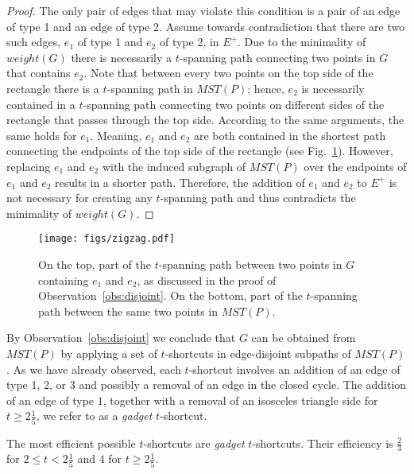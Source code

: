 \documentclass[a4paper]{llncs}
\newcommand{\smallt}{$2 \leq t <2 \frac{1}{5}$}
\newcommand{\bigt}{$t \geq 2 \frac{1}{5}$}
\begin{document}
\begin{proof}
The only pair of edges that may violate this condition is a pair of an edge of type 1 
and an edge of type 2.
Assume towards contradiction that there are two such edges, 
$e_1$ of type 1 and $e_2$ of type 2, in $E^+$.
Due to the minimality of $weight(G)$ there is necessarily a $t$-spanning path 
connecting two points in $G$ that contains $e_2$. 
Note that between every two points on the top side of the rectangle there is 
a $t$-spanning path in $MST(P)$; hence, $e_2$ is necessarily contained in 
a $t$-spanning path connecting two points on different sides of the rectangle
that passes through the top side.
According to the same arguments, the same holds for $e_1$. 
Meaning, $e_1$ and $e_2$ are both contained in the shortest path connecting
the endpoints of the top side of the rectangle (see Fig.~\ref{fig:zigzag}).
However, replacing $e_1$ and $e_2$ with the induced subgraph of $MST(P)$ 
over the endpoints of $e_1$ and $e_2$ results in a shorter path.
Therefore, the addition of $e_1$ and $e_2$ to $E^+$ is not necessary for
creating any $t$-spanning path and thus contradicts the minimality of $weight(G)$.
\end{proof}


\begin{figure}[htb]
    \centering
        \texttt{[image: figs/zigzag.pdf]}
    \caption{On the top, part of the $t$-spanning path between two points in $G$ 
    				containing $e_1$ and $e_2$, as discussed in the proof of Observation~\ref{obs:disjoint}.
    				On the bottom, part of the $t$-spanning path between the same two points in $MST(P)$.}
    \label{fig:zigzag}
\end{figure}

By Observation~\ref{obs:disjoint} we conclude that $G$ can be obtained from $MST(P)$ by applying 
a set of $t$-shortcuts in edge-disjoint subpaths of $MST(P)$.
As we have already observed, each $t$-shortcut involves an addition of an edge of type 1, 2, or 3
and possibly a removal of an edge in the closed cycle. 
The addition of an edge of type $1$, together with a removal of an isosceles triangle side
for \bigt{}, we refer to as a \emph{gadget} $t$-shortcut.

\begin{myclaim}\label{cl:tri}
The most efficient possible $t$-shortcuts are \emph{gadget} $t$-shortcuts. 
Their efficiency is $\frac{2}{3}$ for  \smallt{} and $4$ for \bigt{}.
\end{myclaim}
\end{document}
